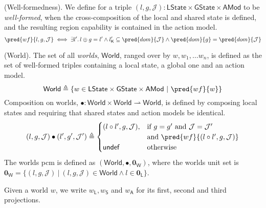 \begin{defn}
	(Well-formedness).
	We define for a triple $(l, g, \mathcal{J}) : \mathsf{LState} \times \mathsf{GState} \times \mathsf{AMod}$ to be \emph{well-formed}, when the cross-composition of the local and shared state is defined, and the resulting region capability is contained in the action model.
	\[
		\pred{wf}{l, g, \mathcal{J}} \iff \exists l' \ldotp l \oplus g = l' \land l'_\mathsf{K} \subseteq \pred{dom}{\mathcal{J}} \land \pred{dom}{g} = \pred{dom}{\mathcal{J}}
	\]
\end{defn}

\begin{defn}
	(World).
	The set of all \emph{worlds}, $\mathsf{World}$, ranged over by $w, w_1, \ldots w_n$, is defined as the set of well-formed triples containing a local state, a global one and an action model.
	\[
		\mathsf{World} \triangleq \{ w \in \mathsf{LState} \times \mathsf{GState} \times \mathsf{AMod}\ |\ \pred{wf}{w} \}
	\]
	Composition on worlds, $\bullet : \mathsf{World} \times \mathsf{World} \rightharpoonup \mathsf{World}$, is defined by composing local states and requiring that shared states and action models be identical.
	\[
		(l, g, \mathcal{J}) \bullet (l', g', \mathcal{J}') \triangleq
		\begin{cases}
			(l \circ l', g, \mathcal{J}), & \text{if } g = g' \text{ and } \mathcal{J} = \mathcal{J}' \\ & \text{and } \pred{wf}{(l \circ l', g, \mathcal{J})}
			\\
			\mathsf{undef} & \text{otherwise}
		\end{cases}
	\]
	The worlds pcm is defined as $(\mathsf{World}, \bullet, \mathbf{0}_\mathsf{W})$, where the worlds unit set is $\mathbf{0}_\mathsf{W} = \{ (l, g, \mathcal{J})\ |\ (l, g, \mathcal{J}) \in \mathsf{World} \land l \in \mathbf{0}_\mathsf{L} \}$.
\end{defn}
Given a world $w$, we write $w_\mathsf{L}, w_\mathsf{S}$ and $w_\mathsf{A}$ for its first, second and third projections.
